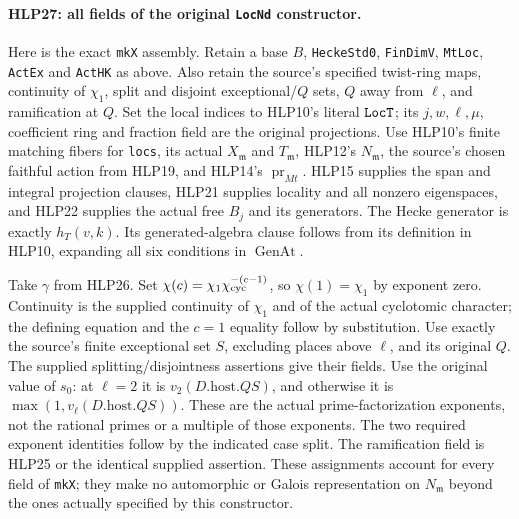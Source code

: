 \paragraph{HLP27: all fields of the original \texttt{Loc\allowbreak Nd} constructor.}
\label{claim:HLP27}
Here is the exact \texttt{mk\allowbreak X} assembly. Retain a base \(B\),
\texttt{Hecke\allowbreak Std0}, \texttt{Fin\allowbreak Dim\allowbreak V}, \texttt{Mt\allowbreak Loc},
\texttt{Act\allowbreak Ex} and \texttt{Act\allowbreak HK} as above. Also retain the source's
specified twist-ring maps, continuity of \(\chi_1\), split and
disjoint exceptional/\(Q\) sets, \(Q\) away from \(\ell\), and
ramification at \(Q\). Set the local indices to HLP10's literal
\(\texttt{Loc\allowbreak T}\); its \(j,w,\ell,\mu\), coefficient ring and
fraction field are the original projections. Use HLP10's finite
matching fibers for \texttt{locs}, its actual \(X_{\mathfrak m}\)
and \(T_{\mathfrak m}\), HLP12's \(N_{\mathfrak m}\), the source's
chosen faithful action from HLP19, and HLP14's
\(\operatorname{pr}_{Mt}\). HLP15 supplies the span and integral
projection clauses, HLP21 supplies locality and all nonzero
eigenspaces, and HLP22 supplies the actual free \(B_j\) and its
generators. The Hecke generator is exactly \(h_T(v,k)\).
Its generated-algebra clause follows from its definition in
HLP10, expanding all six conditions in \(\operatorname{GenAt}\).

Take \(\gamma\) from HLP26. Set
\(\chi(c)=\chi_1\chi_{\rm cyc}^{-(c-1)}\), so
\(\chi(1)=\chi_1\) by exponent zero. Continuity is the supplied
continuity of \(\chi_1\) and of the actual cyclotomic character;
the defining equation and the \(c=1\) equality follow by
substitution. Use exactly the source's finite exceptional set
\(S\), excluding places above \(\ell\), and its original \(Q\).
The supplied splitting/disjointness assertions give their fields.
Use the original value of \(s_0\): at \(\ell=2\) it is \(v_2(D.\mathrm{host}.QS)\), and otherwise
it is \(\max(1,v_\ell(D.\mathrm{host}.QS))\). These are the
actual prime-factorization exponents, not the rational primes
or a multiple of those exponents. The two required exponent
identities follow by the indicated case split.
The ramification field is HLP25 or the identical supplied assertion.
These assignments account for every field of \texttt{mk\allowbreak X}; they
make no automorphic or Galois representation on \(N_{\mathfrak m}\)
beyond the ones actually specified by this constructor.

